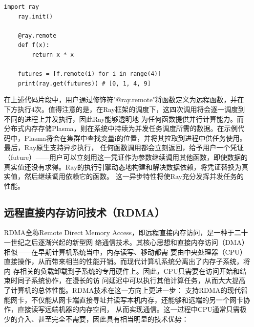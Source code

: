 \begin{lstlisting}[style=sysupython, caption=Ray代码示例]
	import ray
	ray.init()
	
	@ray.remote
	def f(x):
	    return x * x
	
	futures = [f.remote(i) for i in range(4)]
	print(ray.get(futures)) # [0, 1, 4, 9]
\end{lstlisting}

在上述代码片段中，用户通过修饰符"@ray.remote"将函数定义为远程函数，并在下方执行4次。值得注意的是，在Ray框架的调度下，这四次调用将会逐一调度到不同的进程上并发执行，因此Ray能够透明地
为任何函数提供并行计算能力。而分布式内存存储Plasma，则在系统中持续为并发任务调度所需的数据。在示例代码中，Plasma将会在集群中查找变量i的位置，并将其拉取到进程中供任务使用。最后，Ray原生支持异步执行，
任何函数调用都会立刻返回，给予用户一个凭证（future）——用户可以立刻用这一凭证作为参数继续调用其他函数，即使数据的真实值还没有求得。Ray的执行引擎动态地构建和解决数据依赖，将凭证替换为真实值，然后继续调用依赖它的函数。
这一异步特性将使Ray充分发挥并发任务的性能。

\subsection{远程直接内存访问技术（RDMA）}

RDMA全称Remote Direct Memory Access，即远程直接内存访问，是一种于二十一世纪之后逐渐兴起的新型网
络通信技术。其核心思想和直接内存访问（DMA）相似——在早期计算机系统当中，内存读写、移动都需
要由中央处理器（CPU）直接操作，从而带来相当的性能开销。而现代计算机系统分离出了内存子系统，将内
存相关的负载卸载到子系统的专用硬件上。因此，CPU只需要在访问开始和结束时同子系统协作，在漫长的访
问延迟中可以执行其他计算任务，从而大大提高了计算机的总体性能。RDMA技术在这一方向上更进一步：
支持RDMA的现代智能网卡，不仅能从网卡端直接寻址并读写本机内存，还能够和远端的另一个网卡协作，直接读写远端机器的内存空间，
从而实现通信。这一过程中CPU通常只需极少的介入、甚至完全不需要，因此具有相当明显的技术优势：

